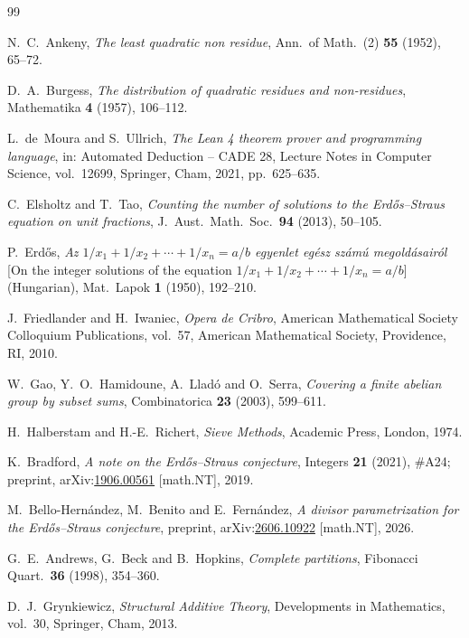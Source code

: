 \documentclass[11pt]{article}
\theoremstyle{plain}
\theoremstyle{remark}
\theoremstyle{plain}
\numberwithin{equation}{section}
\begin{document}
\begin{thebibliography}{99}

N.~C.~Ankeny,
\emph{The least quadratic non residue},
Ann.\ of Math.\ (2) \textbf{55} (1952), 65--72.

D.~A.~Burgess,
\emph{The distribution of quadratic residues and non-residues},
Mathematika \textbf{4} (1957), 106--112.

L.~de~Moura and S.~Ullrich,
\emph{The Lean 4 theorem prover and programming language},
in: Automated Deduction -- CADE 28,
Lecture Notes in Computer Science, vol.~12699,
Springer, Cham, 2021, pp.~625--635.

C.~Elsholtz and T.~Tao,
\emph{Counting the number of solutions to the Erd\H{o}s--Straus equation
on unit fractions},
J.~Aust.\ Math.\ Soc.\ \textbf{94} (2013), 50--105.

P.~Erd\H{o}s,
\emph{Az $1/x_1 + 1/x_2 + \cdots + 1/x_n = a/b$ egyenlet eg\'esz
sz\'am\'u megold\'asair\'ol}
[On the integer solutions of the equation
$1/x_1 + 1/x_2 + \cdots + 1/x_n = a/b$] (Hungarian),
Mat.\ Lapok \textbf{1} (1950), 192--210.

J.~Friedlander and H.~Iwaniec,
\emph{Opera de Cribro},
American Mathematical Society Colloquium Publications, vol.~57,
American Mathematical Society, Providence, RI, 2010.

W.~Gao, Y.~O.~Hamidoune, A.~Llad\'o and O.~Serra,
\emph{Covering a finite abelian group by subset sums},
Combinatorica \textbf{23} (2003), 599--611.

H.~Halberstam and H.-E.~Richert,
\emph{Sieve Methods},
Academic Press, London, 1974.

K.~Bradford,
\emph{A note on the Erd\H{o}s--Straus conjecture},
Integers \textbf{21} (2021), \#A24; preprint,
arXiv:\href{https://arxiv.org/abs/1906.00561}{1906.00561} [math.NT], 2019.

M.~Bello-Hern\'andez, M.~Benito and E.~Fern\'andez,
\emph{A divisor parametrization for the Erd\H{o}s--Straus conjecture},
preprint, arXiv:\href{https://arxiv.org/abs/2606.10922}{2606.10922}
[math.NT], 2026.

G.~E.~Andrews, G.~Beck and B.~Hopkins,
\emph{Complete partitions},
Fibonacci Quart.\ \textbf{36} (1998), 354--360.

D.~J.~Grynkiewicz,
\emph{Structural Additive Theory},
Developments in Mathematics, vol.~30, Springer, Cham, 2013.


\end{thebibliography}
\end{document}
